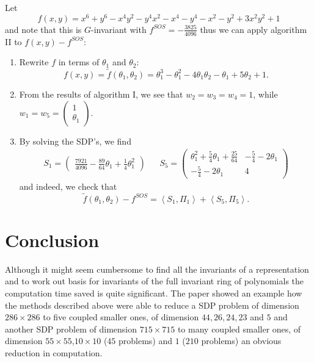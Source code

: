 \documentclass[]{article}
\begin{document}
Let 
\[
    f(x,y)=x^6+y^6-x^4y^2-y^4x^2-x^4-y^4-x^2-y^2+3x^2y^2+1
\]
and note that this is $G$-invariant with $f^{SOS}=-\frac{3825}{4096}$ thus we can apply algorithm II to $f(x,y)-f^{SOS}$:
\begin{enumerate}
    \item Rewrite $f$ in terms of $\theta_1$ and $\theta_2$:
    \[
        f(x,y)=\tilde{f}(\theta_1,\theta_2)=\theta_1^3-\theta_1^2-4\theta_1\theta_2-\theta_1+5\theta_2+1.
    \]

    \item From the results of algorithm I, we see that $w_2=w_3=w_4=1$, while $w_1=w_5=\begin{pmatrix}1\\\theta_1\end{pmatrix}$.
    
    \item By solving the SDP's, we find 
    \begin{align*}
        S_1=\begin{pmatrix}\frac{7921}{4096}-\frac{89}{64}\theta_1+\frac{1}{4}\theta_1^2\end{pmatrix} &&
        S_5=\begin{pmatrix}\theta_1^2+\frac54\theta_1+\frac{25}{64}&-\frac54-2\theta_1\\-\frac54-2\theta_1&4\end{pmatrix}
    \end{align*}
    and indeed, we check that
    \[
        \tilde{f}(\theta_1,\theta_2)-f^{SOS}=\left<S_1,\Pi_1\right>+\left<S_5,\Pi_5\right>.
    \] 
\end{enumerate}

\section*{Conclusion}
Although it might seem cumbersome to find all the invariants of a representation and to work out basis for invariants of the full invariant ring of polynomials the computation time saved is quite significant. The paper showed an example how the methods described above were able to reduce a SDP problem of dimension $286\times286$ to five coupled smaller ones, of dimension $44,26,24,23$ and $5$ and another SDP problem of dimension $715\times715$ to many coupled smaller ones, of dimension $55\times55$,$10\times10$ ($45$ problems) and $1$ ($210$ problems) an obvious reduction in computation.


\nocite{Gatermann_2004}

\printbibliography
\end{document}
